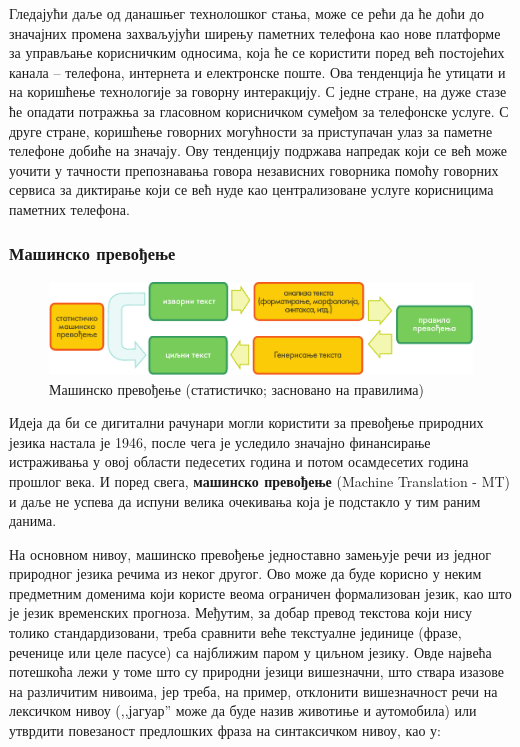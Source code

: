\begin{multicols}{2}
Гледајући даље од данашњег технолошког стања, може се рећи да ће доћи до значајних промена захваљујући ширењу паметних телефона као нове платформе за управљање корисничким односима, која ће се користити поред већ постојећих канала – телефона, интернета и електронске поште. Ова тенденција ће утицати и на коришћење технологије за говорну интеракцију. С једне стране, на дуже стазе ће опадати потражња за гласовном корисничком сумеђом за телефонске услуге. С друге стране, коришћење говорних могућности за приступачан улаз за паметне телефоне добиће на значају. Ову тенденцију подржава напредак који се већ може уочити у тачности препознавања говора независних говорника помоћу говорних сервиса за диктирање који се већ нуде као централизоване услуге корисницима паметних телефона. 

 \subsubsection {Машинско превођење}
   

\begin{figure}[htb]
  \center
  \includegraphics[width=\textwidth]{../_media/serbian/machine_translation}
  \caption{Машинско превођење (статистичко; засновано на правилима)}
  \label{fig:mtarch_sr}
\end{figure}

Идеја да би се дигитални рачунари могли користити за превођење природних језика настала је 1946, после чега је уследило значајно финансирање истраживања у овој области педесетих година и потом осамдесетих година прошлог века. И поред свега, \textbf{машинско превођење} (Machine Translation - MT) и даље не успева да испуни велика очекивања која је подстакло у тим раним данима. 


На основном нивоу, машинско превођење једноставно замењује речи из једног природног језика речима из неког другог. Ово може да буде корисно у неким предметним доменима који користе веома ограничен формализован језик, као што је језик временских прогноза. Међутим, за добар превод текстова који нису толико стандардизовани, треба сравнити веће текстуалне јединице (фразе, реченице или целе пасусе) са најближим паром у циљном језику. Овде највећа потешкоћа лежи у томе што су природни језици вишезначни, што ствара изазове на различитим нивоима, јер треба, на пример, отклонити вишезначност речи на лексичком нивоу (,,јагуар'' може да буде назив животиње и аутомобила) или утврдити повезаност предлошких фраза на синтаксичком нивоу, као у:


\end{multicols}
